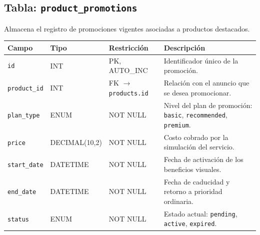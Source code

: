 \documentclass[11pt,a4paper]{report}
\begin{document}
\subsection{Tabla: \texttt{product\_promotions}}
Almacena el registro de promociones vigentes asociadas a productos destacados.
\begin{table}[H]
\centering
\begin{tabularx}{\textwidth}{|l|l|l|L|}
\hline
{}\textbf{Campo} & \textbf{Tipo} & \textbf{Restricción} & \textbf{Descripción} \\ \hline
\texttt{id} & INT & PK, AUTO\_INC & Identificador único de la promoción. \\ \hline
\texttt{product\_id} & INT & FK $\rightarrow$ \texttt{products.id} & Relación con el anuncio que se desea promocionar. \\ \hline
\texttt{plan\_type} & ENUM & NOT NULL & Nivel del plan de promoción: \texttt{basic}, \texttt{recommended}, \texttt{premium}. \\ \hline
\texttt{price} & DECIMAL(10,2) & NOT NULL & Costo cobrado por la simulación del servicio. \\ \hline
\texttt{start\_date} & DATETIME & NOT NULL & Fecha de activación de los beneficios visuales. \\ \hline
\texttt{end\_date} & DATETIME & NOT NULL & Fecha de caducidad y retorno a prioridad ordinaria. \\ \hline
\texttt{status} & ENUM & NOT NULL & Estado actual: \texttt{pending}, \texttt{active}, \texttt{expired}. \\ \hline
\end{tabularx}
\end{table}
\end{document}
